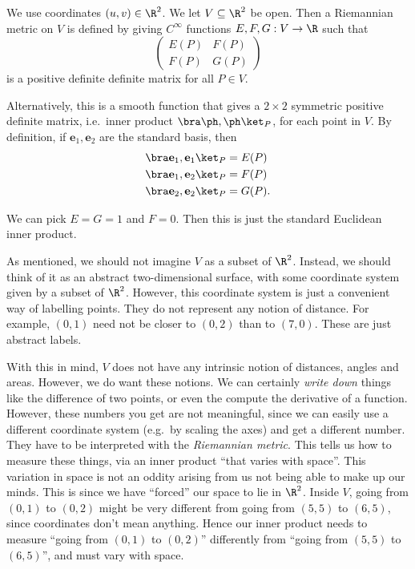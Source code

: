 \documentclass[a4paper]{article}
\begin{document}
\begin{defi}
  We use coordinates $(u, v) \in \R^2$. We let $V \subseteq \R^2$ be open. Then a Riemannian metric on $V$ is defined by giving $C^{\infty}$ functions $E, F, G: V \to \R$ such that
  \[
    \begin{pmatrix}
      E(P) & F(P)\\
      F(P) & G(P)
    \end{pmatrix}
  \]
  is a positive definite definite matrix for all $P \in V$.

  Alternatively, this is a smooth function that gives a $2\times 2$ symmetric positive definite matrix, i.e.\ inner product $\bra \ph, \ph\ket_P$, for each point in $V$. By definition, if $\mathbf{e}_1, \mathbf{e}_2$ are the standard basis, then
  \begin{align*}
    \bra \mathbf{e}_1, \mathbf{e}_1\ket_P &= E(P)\\
    \bra \mathbf{e}_1, \mathbf{e}_2\ket_P &= F(P)\\
    \bra \mathbf{e}_2, \mathbf{e}_2\ket_P &= G(P).
  \end{align*}
\end{defi}
\begin{eg}
  We can pick $E = G = 1$ and $F = 0$. Then this is just the standard Euclidean inner product.
\end{eg}

As mentioned, we should not imagine $V$ as a subset of $\R^2$. Instead, we should think of it as an abstract two-dimensional surface, with some coordinate system given by a subset of $\R^2$. However, this coordinate system is just a convenient way of labelling points. They do not represent any notion of distance. For example, $(0, 1)$ need not be closer to $(0, 2)$ than to $(7, 0)$. These are just abstract labels.

With this in mind, $V$ does not have any intrinsic notion of distances, angles and areas. However, we do want these notions. We can certainly \emph{write down} things like the difference of two points, or even the compute the derivative of a function. However, these numbers you get are not meaningful, since we can easily use a different coordinate system (e.g.\ by scaling the axes) and get a different number. They have to be interpreted with the \emph{Riemannian metric}. This tells us how to measure these things, via an inner product ``that varies with space''. This variation in space is not an oddity arising from us not being able to make up our minds. This is since we have ``forced'' our space to lie in $\R^2$. Inside $V$, going from $(0, 1)$ to $(0, 2)$ might be very different from going from $(5, 5)$ to $(6, 5)$, since coordinates don't mean anything. Hence our inner product needs to measure ``going from $(0, 1)$ to $(0, 2)$'' differently from ``going from $(5, 5)$ to $(6, 5)$'', and must vary with space.
\end{document}
